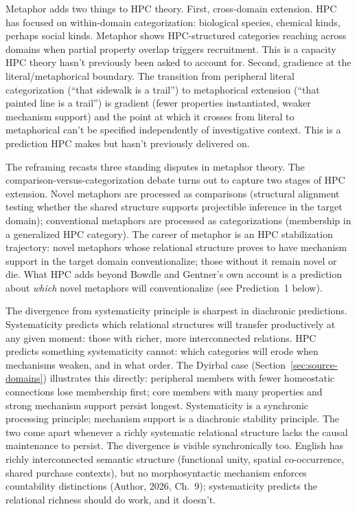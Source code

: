 \documentclass[12pt]{article}
\begin{document}
Metaphor adds two things to HPC theory. First, cross-domain extension. HPC has focused on within-domain categorization: biological species, chemical kinds, perhaps social kinds. Metaphor shows HPC-structured categories reaching across domains when partial property overlap triggers recruitment. This is a capacity HPC theory hasn't previously been asked to account for. Second, gradience at the literal/metaphorical boundary. The transition from peripheral literal categorization (\enquote{that sidewalk is a trail}) to metaphorical extension (\enquote{that painted line is a trail}) is gradient (fewer properties instantiated, weaker mechanism support) and the point at which it crosses from literal to metaphorical can't be specified independently of investigative context. This is a prediction HPC makes but hasn't previously delivered on.

The reframing recasts three standing disputes in metaphor theory. The comparison-versus-categorization debate \citep{gentner1983, glucksberg2001} turns out to capture two stages of HPC extension. Novel metaphors are processed as comparisons (structural alignment testing whether the shared structure supports projectible inference in the target domain); conventional metaphors are processed as categorizations (membership in a generalized HPC category). The career of metaphor \citep{bowdle2005} is an HPC stabilization trajectory: novel metaphors whose relational structure proves to have mechanism support in the target domain conventionalize; those without it remain novel or die. What HPC adds beyond Bowdle and Gentner's own account is a prediction about \emph{which} novel metaphors will conventionalize (see Prediction~1 below).

The divergence from  systematicity principle is sharpest in diachronic predictions. Systematicity predicts which relational structures will transfer productively at any given moment: those with richer, more interconnected relations. HPC predicts something systematicity cannot: which categories will erode when mechanisms weaken, and in what order. The Dyirbal case (Section~\ref{sec:source-domains}) illustrates this directly: peripheral members with fewer homeostatic connections lose membership first; core members with many properties and strong mechanism support persist longest. Systematicity is a synchronic processing principle; mechanism support is a diachronic stability principle. The two come apart whenever a richly systematic relational structure lacks the causal maintenance to persist. The divergence is visible synchronically too. English  has richly interconnected semantic structure (functional unity, spatial co-occurrence, shared purchase contexts), but no morphosyntactic mechanism enforces countability distinctions (Author, 2026, Ch.~9); systematicity predicts the relational richness should do work, and it doesn't.
\end{document}
